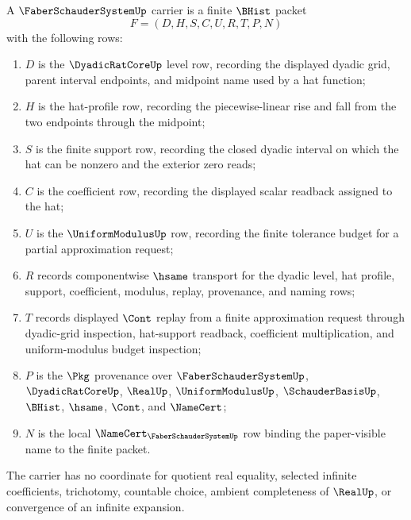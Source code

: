 \begin{definition}
\label{def:faber-schauder-system-carrier}
A $\FaberSchauderSystemUp$ carrier is a finite $\BHist$ packet
$$
F=(D,H,S,C,U,R,T,P,N)
$$
with the following rows:
\begin{enumerate}
\item $D$ is the $\DyadicRatCoreUp$ level row, recording the displayed dyadic grid, parent interval endpoints, and midpoint name used by a hat function;
\item $H$ is the hat-profile row, recording the piecewise-linear rise and fall from the two endpoints through the midpoint;
\item $S$ is the finite support row, recording the closed dyadic interval on which the hat can be nonzero and the exterior zero reads;
\item $C$ is the coefficient row, recording the displayed scalar readback assigned to the hat;
\item $U$ is the $\UniformModulusUp$ row, recording the finite tolerance budget for a partial approximation request;
\item $R$ records componentwise $\hsame$ transport for the dyadic level, hat profile, support, coefficient, modulus, replay, provenance, and naming rows;
\item $T$ records displayed $\Cont$ replay from a finite approximation request through dyadic-grid inspection, hat-support readback, coefficient multiplication, and uniform-modulus budget inspection;
\item $P$ is the $\Pkg$ provenance over $\FaberSchauderSystemUp$, $\DyadicRatCoreUp$, $\RealUp$, $\UniformModulusUp$, $\SchauderBasisUp$, $\BHist$, $\hsame$, $\Cont$, and $\NameCert$;
\item $N$ is the local $\NameCert_{\FaberSchauderSystemUp}$ row binding the paper-visible name to the finite packet.
\end{enumerate}
The carrier has no coordinate for quotient real equality, selected infinite coefficients, trichotomy, countable choice, ambient completeness of $\RealUp$, or convergence of an infinite expansion.
\end{definition}

